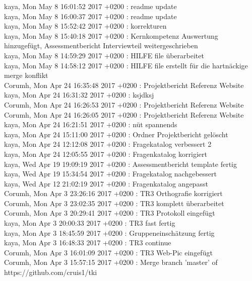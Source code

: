 kaya, Mon May 8 16:01:52 2017 +0200 : readme update\\
kaya, Mon May 8 16:00:37 2017 +0200 : readme update\\
kaya, Mon May 8 15:52:42 2017 +0200 : korrekturen\\
kaya, Mon May 8 15:40:18 2017 +0200 : Kernkompetenz Auswertung hinzugefügt, Assessmentbericht Interviewteil weitergeschrieben\\
kaya, Mon May 8 14:59:29 2017 +0200 : HILFE file überarbeitet\\
kaya, Mon May 8 14:58:12 2017 +0200 : HILFE file erstellt für die hartnäckige merge konflikt\\
Corumh, Mon Apr 24 16:35:48 2017 +0200 : Projektbericht Referenz Website\\
kaya, Mon Apr 24 16:31:32 2017 +0200 : ksjdksj\\
Corumh, Mon Apr 24 16:26:53 2017 +0200 : Projektbericht Referenz Website\\
Corumh, Mon Apr 24 16:26:05 2017 +0200 : Projektbericht Referenz Website\\
kaya, Mon Apr 24 16:21:51 2017 +0200 : nüt spannends\\
kaya, Mon Apr 24 15:11:00 2017 +0200 : Ordner Projektbericht gelöscht\\
kaya, Mon Apr 24 12:12:08 2017 +0200 : Fragekatalog verbessert 2\\
kaya, Mon Apr 24 12:05:55 2017 +0200 : Fragenkatalog korrigiert\\
kaya, Wed Apr 19 19:09:19 2017 +0200 : Assessmentbericht template fertig\\
kaya, Wed Apr 19 15:34:54 2017 +0200 : Fragekatalog nachgebessert\\
kaya, Wed Apr 12 21:02:19 2017 +0200 : Fragenkatalog angepasst\\
Corumh, Mon Apr 3 23:26:16 2017 +0200 : TR3 Orthografie korrigiert\\
Corumh, Mon Apr 3 23:02:35 2017 +0200 : TR3 komplett überarbeitet\\
Corumh, Mon Apr 3 20:29:41 2017 +0200 : TR3 Protokoll eingefügt\\
kaya, Mon Apr 3 20:00:33 2017 +0200 : TR3 fast fertig\\
kaya, Mon Apr 3 18:45:59 2017 +0200 : Gruppeneinschätzung fertig\\
kaya, Mon Apr 3 16:48:33 2017 +0200 : TR3 continue\\
Corumh, Mon Apr 3 16:01:09 2017 +0200 : TR3 Web-Pic eingefügt\\
Corumh, Mon Apr 3 15:57:15 2017 +0200 : Merge branch 'master' of https://github.com/cruis1/tki\\
